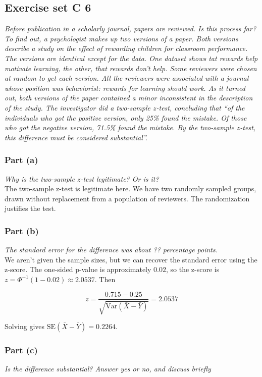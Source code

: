 \documentclass[11pt]{article}
\newcommand{\var}{\textrm{Var}}
\begin{document}
\subsection*{Exercise set C 6} %
\textit{Before publication in a scholarly journal, papers are reviewed. Is this process far? To find out, a psychologist makes up two versions of a paper. Both versions describe a study on the effect of rewarding children for classroom performance. The versions are identical except for the data. One dataset shows tat rewards help motivate learning, the other, that rewards don't help. Some reviewers were chosen at random to get each version. All the reviewers were associated with a journal whose position was behaviorist: rewards for learning should work. As it turned out, both versions of the paper contained a minor inconsistent in the description of the study. The investigator did a two-sample $z$-test, concluding that ``of the individuals who got the positive version, only 25\% found the mistake. Of those who got the negative version, 71.5\% found the mistake. By the two-sample $z$-test, this difference must be considered substantial''.}
\subsubsection*{Part (a)}
\textit{Why is the two-sample $z$-test legitimate? Or is it?}\\

The two-sample z-test is legitimate here.  We have two randomly sampled groups, drawn without replacement from a population of reviewers.  The randomization justifies the test.

\subsubsection*{Part (b)}
\textit{The standard error for the difference was about ?? percentage points.}\\

We aren't given the sample sizes, but we can recover the standard error using the z-score.  The one-sided p-value is approximately $0.02$, so the z-score is $z = \Phi^{-1}(1 - 0.02) \approx 2.0537$.  Then

$$ z = \frac{0.715 - 0.25}{\sqrt{\var(\bar{X} - \bar{Y})}} = 2.0537$$

Solving gives $\text{SE}(\bar{X} - \bar{Y}) = 0.2264$.

\subsubsection*{Part (c)}
\textit{Is the difference substantial? Answer yes or no, and discuss briefly}\\
\end{document}
